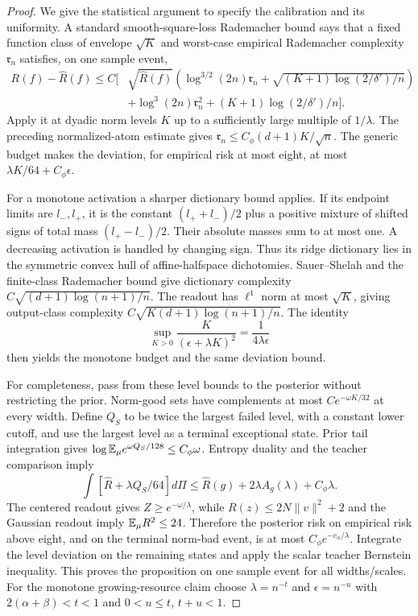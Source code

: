 \begin{proof}
We give the statistical argument to specify the calibration and its uniformity. A standard smooth-square-loss Rademacher bound \cite{sst} says that a fixed function class of envelope $\sqrt K$ and worst-case empirical Rademacher complexity $\mathfrak r_n$ satisfies, on one sample event,
\begin{equation}
 \begin{aligned}
 R(f)-\widehat R(f)\le C\bigg[&\sqrt{\widehat R(f)}
 \left(\log^{3/2}(2n)\mathfrak r_n+\sqrt{(K+1)\log(2/\delta')/n}\right)\\
 &+\log^3(2n)\mathfrak r_n^2+(K+1)\log(2/\delta')/n\bigg].
 \end{aligned}
 \label{eq:smooth-loss}
\end{equation}
Apply it at dyadic norm levels $K$ up to a sufficiently large multiple of $1/\lambda$. The preceding normalized-atom estimate gives $\mathfrak r_n\le C_\phi(d+1)K/\sqrt n$. The generic budget makes the deviation, for empirical risk at most eight, at most $\lambda K/64+C_\phi\epsilon$.

For a monotone activation a sharper dictionary bound applies. If its endpoint limits are $l_-,l_+$, it is the constant $(l_++l_-)/2$ plus a positive mixture of shifted signs of total mass $(l_+-l_-)/2$. Their absolute masses sum to at most one. A decreasing activation is handled by changing sign. Thus its ridge dictionary lies in the symmetric convex hull of affine-halfspace dichotomies. Sauer--Shelah and the finite-class Rademacher bound give dictionary complexity $C\sqrt{(d+1)\log(n+1)/n}$. The readout has $\ell^1$ norm at most $\sqrt K$, giving output-class complexity $C\sqrt{K(d+1)\log(n+1)/n}$. The identity
\[
 \sup_{K>0}\frac{K}{(\epsilon+\lambda K)^2}=\frac1{4\lambda\epsilon}
\]
then yields the monotone budget and the same deviation bound.

For completeness, pass from these level bounds to the posterior without restricting the prior. Norm-good sets have complements at most $C e^{-\omega K/32}$ at every width. Define $Q_S$ to be twice the largest failed level, with a constant lower cutoff, and use the largest level as a terminal exceptional state. Prior tail integration gives
$\log\mathbb E_\mu e^{\omega Q_S/128}\le C_\phi\omega$.
Entropy duality and the teacher comparison imply
\[
 \int[\widehat R+\lambda Q_S/64]d\Pi
 \le\widehat R(g)+2\lambda A_g(\lambda)+C_\phi\lambda.
\]
The centered readout gives $Z\ge e^{-\omega/\lambda}$, while $R(z)\le2N\|v\|^2+2$ and the Gaussian readout imply $\mathbb E_\mu R^2\le24$. Therefore the posterior risk on empirical risk above eight, and on the terminal norm-bad event, is at most $C_\phi e^{-c_\phi/\lambda}$. Integrate the level deviation on the remaining states and apply the scalar teacher Bernstein inequality. This proves the proposition on one sample event for all widths/scales. For the monotone growing-resource claim choose $\lambda=n^{-t}$ and $\epsilon=n^{-u}$ with $2(\alpha+\beta)<t<1$ and $0<u\le t$, $t+u<1$.
\end{proof}

